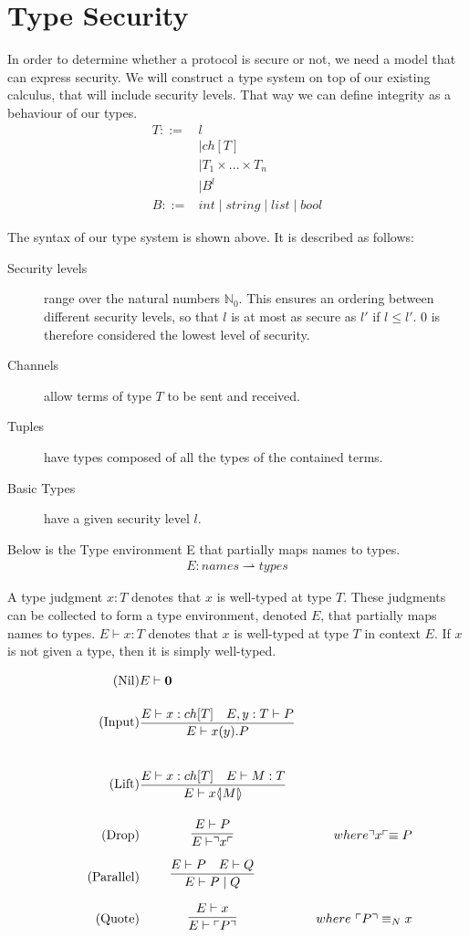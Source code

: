 \section{Type Security}
In order to determine whether a protocol is secure or not, we need a model that can express security.
We will construct a type system on top of our existing calculus, that will include security levels.
That way we can define integrity as a behaviour of our types.
\begin{align*}
	T::=&l \tag{Security Level}\\
	&\mid ch[T] \tag{Channel}\\
	&\mid T_1 \times...\times T_n \tag{Tuple}\\
	&\mid B^l \tag{Basic}\\
	B::=&int 
	\mid string 
	\mid list 
	\mid bool 
\end{align*}

\noindent The syntax of our type system is shown above. It is described as follows:

\begin{description}
\item[Security levels] range over the natural numbers $\mathbb{N}_0$. This ensures an ordering between different security levels, so that $l$ is at most as secure as $l'$ if $l\leq l'$. $0$ is therefore considered the lowest level of security.
\item[Channels] allow terms of type $T$ to be sent and received.
\item[Tuples] have types composed of all the types of the contained terms.
\item[Basic Types] have a given security level $l$.
\end{description}

Below is the Type environment E that partially maps names to types.
\begin{align*}
E: names \rightharpoonup types
\end{align*}

\noindent A type judgment $x:T$ denotes that $x$ is well-typed at type $T$.
These judgments can be collected to form a type environment, denoted $E$, that partially maps names to types.
$E\vdash x:T$ denotes that $x$ is well-typed at type $T$ in context $E$.
If $x$ is not given a type, then it is simply well-typed.


\begin{align}
\tag{Nil} &E \vdash \nil\\
\tag{Input} &\infrule{E\vdash x:ch[T]\quad E,y:T\vdash P}{E \vdash \inp{x}{y}P}\\
\tag{Lift} &\infrule{E\vdash x:ch[T]\quad E \vdash M:T}{E\vdash \lift{x}{M}}\\
\tag{Drop} &\infrule{E \vdash P}{E\vdash \drop{x}}& where \drop{x} \equiv P\\
\tag{Parallel} &\infrule{E\vdash P \quad E \vdash Q}{E \vdash P \para Q}\\
\tag{Quote} &\infrule{E \vdash x}{E\vdash \quot{P}}& where\ \quot{P} \equiv_N x
\end{align}


